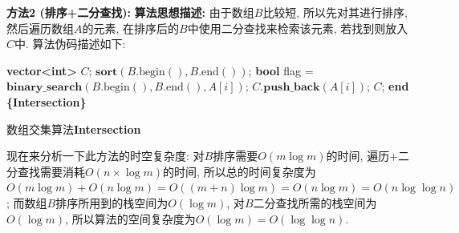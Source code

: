 \documentclass{article}
\begin{document}
\begin{homeworkProblem}
	\textbf{方法2 (排序+二分查找):} \textbf{算法思想描述:} 由于数组$B$比较短, 所以先对其进行排序, 然后遍历数组$A$的元素, 在排序后的$B$中使用二分查找来检索该元素, 若找到则放入$C$中. 算法伪码描述如下:
	\begin{algorithm}[H]
		\begin{algorithmic}[1]
		\State \textbf{vector<int>} $C$;
		\State $\textbf{sort}(B.\text{begin}(), B.\text{end}())$;  
			\State \textbf{bool} flag = $\textbf{binary_search}(B.\text{begin}(), B.\text{end}(), A[i])$;
				\State $C.\textbf{push_back}(A[i])$;
			\EndIf
		\EndFor
		\State \Return $C$;
		\State \textbf{end \{Intersection\}} 
		\end{algorithmic}
		\caption{数组交集算法\textbf{Intersection}}
		\label{alg:交集算法}
	\end{algorithm}
	现在来分析一下此方法的时空复杂度: 对$B$排序需要$O(m\log m)$的时间, 遍历+二分查找需要消耗$O(n\times \log m)$的时间, 所以总的时间复杂度为$O\left( m\log m \right) +O\left( n\log m \right) =O\left( \left( m+n \right) \log m \right) =O\left( n\log m \right) =O\left( n\log\log n \right)$; 而数组$B$排序所用到的栈空间为$O(\log m)$, 对$B$二分查找所需的栈空间为$O(\log m)$, 所以算法的空间复杂度为$O(\log m)=O(\log \log n)$.
	\newpage
\end{homeworkProblem}


\pagebreak
\end{document}

